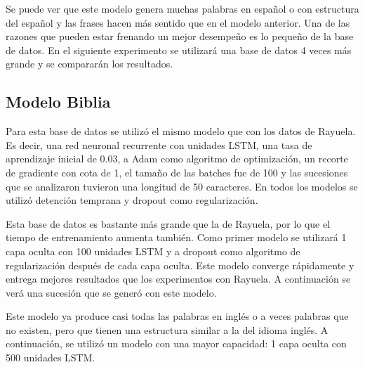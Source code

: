 Se puede ver que este modelo genera muchas palabras en español o con estructura del español y las frases hacen más sentido que en el modelo anterior. Una de las razones que pueden estar frenando un mejor desempeño es lo pequeño de la base de datos. En el siguiente experimento se utilizará una base de datos 4 veces más grande y se compararán los resultados.


\subsection{Modelo Biblia}
Para esta base de datos se utilizó el mismo modelo que con los datos de Rayuela. Es decir, una red neuronal recurrente con unidades LSTM, una tasa de aprendizaje inicial de 0.03, a Adam como algoritmo de optimización, un recorte de gradiente con cota de 1, el tamaño de las batches fue de 100 y las sucesiones que se analizaron tuvieron una longitud de 50 caracteres. En todos los modelos se utilizó detención temprana y dropout como regularización.

\vspace{1em}

Esta base de datos es bastante más grande que la de Rayuela, por lo que el tiempo de entrenamiento aumenta también. Como primer modelo se utilizará 1 capa oculta con 100 unidades LSTM y a dropout como algoritmo de regularización después de cada capa oculta. Este modelo converge rápidamente y entrega mejores resultados que los experimentos con Rayuela. A continuación se verá una sucesión que se generó con este modelo.

\vspace{1em}


\vspace{1em}

Este modelo ya produce casi todas las palabras en inglés o a veces palabras que no existen, pero que tienen una estructura similar a la del idioma inglés. A continuación, se utilizó un modelo con una mayor capacidad: 1 capa oculta con 500 unidades LSTM.

